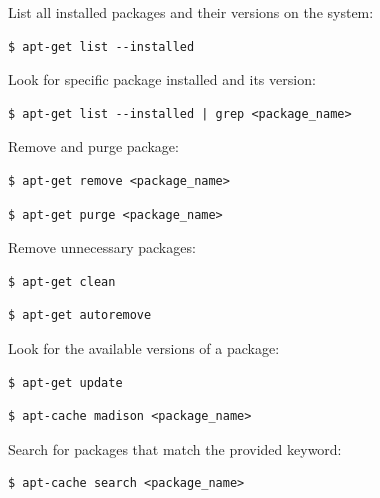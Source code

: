 \documentclass{article}
\newenvironment{codetemplate}[1][]{%
  \mybasecolorbox[#1]
  \itshape
}{%
  \endmybasecolorbox
}
\begin{document}
List all installed packages and their versions on the system:
\begin{codetemplate}
\begin{verbatim}
$ apt-get list --installed
\end{verbatim}
\end{codetemplate}

Look for specific package installed and its version:
\begin{codetemplate}
\begin{verbatim}
$ apt-get list --installed | grep <package_name>
\end{verbatim}
\end{codetemplate}

Remove and purge package:
\begin{codetemplate}
\begin{verbatim}
$ apt-get remove <package_name>
\end{verbatim}
\end{codetemplate}
\begin{codetemplate}
\begin{verbatim}
$ apt-get purge <package_name>
\end{verbatim}
\end{codetemplate}

Remove unnecessary packages:
\begin{codetemplate}
\begin{verbatim}
$ apt-get clean
\end{verbatim}
\end{codetemplate}
\begin{codetemplate}
\begin{verbatim}
$ apt-get autoremove
\end{verbatim}
\end{codetemplate}

Look for the available versions of a package:
\begin{codetemplate}
\begin{verbatim}
$ apt-get update
\end{verbatim}
\end{codetemplate}
\begin{codetemplate}
\begin{verbatim}
$ apt-cache madison <package_name>
\end{verbatim}
\end{codetemplate}

Search for packages that match the provided keyword:
\begin{codetemplate}
\begin{verbatim}
$ apt-cache search <package_name>
\end{verbatim}
\end{codetemplate}
\end{document}
